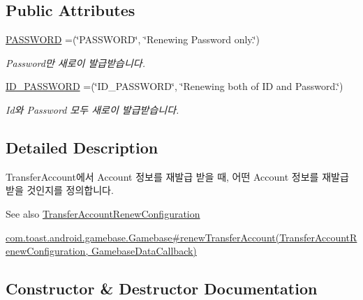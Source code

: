 \subsection*{Public Attributes}
\begin{DoxyCompactItemize}
\item 
\hyperlink{enumcom_1_1toast_1_1android_1_1gamebase_1_1auth_1_1transfer_1_1data_1_1_renewal_target_type_a3326d90c69de890a754f0806f94607e2}{P\+A\+S\+S\+W\+O\+RD} =(\char`\"{}P\+A\+S\+S\+W\+O\+RD\char`\"{}, \char`\"{}Renewing Password only.\char`\"{})
\begin{DoxyCompactList}\small\item\em Password만 새로이 발급받습니다. \end{DoxyCompactList}\item 
\hyperlink{enumcom_1_1toast_1_1android_1_1gamebase_1_1auth_1_1transfer_1_1data_1_1_renewal_target_type_acf2255719802722956c28f924fed0575}{I\+D\+\_\+\+P\+A\+S\+S\+W\+O\+RD} =(\char`\"{}I\+D\+\_\+\+P\+A\+S\+S\+W\+O\+RD\char`\"{}, \char`\"{}Renewing both of ID and Password.\char`\"{})
\begin{DoxyCompactList}\small\item\em Id와 Password 모두 새로이 발급받습니다. \end{DoxyCompactList}\end{DoxyCompactItemize}


\subsection{Detailed Description}
Transfer\+Account에서 Account 정보를 재발급 받을 때, 어떤 Account 정보를 재발급 받을 것인지를 정의합니다. 

\begin{DoxySeeAlso}{See also}
\hyperlink{classcom_1_1toast_1_1android_1_1gamebase_1_1auth_1_1transfer_1_1data_1_1_transfer_account_renew_configuration}{Transfer\+Account\+Renew\+Configuration} 

\hyperlink{}{com.\+toast.\+android.\+gamebase.\+Gamebase\#renew\+Transfer\+Account(\+Transfer\+Account\+Renew\+Configuration, Gamebase\+Data\+Callback)} 
\end{DoxySeeAlso}


\subsection{Constructor \& Destructor Documentation}
\mbox{\label{enumcom_1_1toast_1_1android_1_1gamebase_1_1auth_1_1transfer_1_1data_1_1_renewal_target_type_a0f31b31c6017ff20d4748dbee739c357}} 
